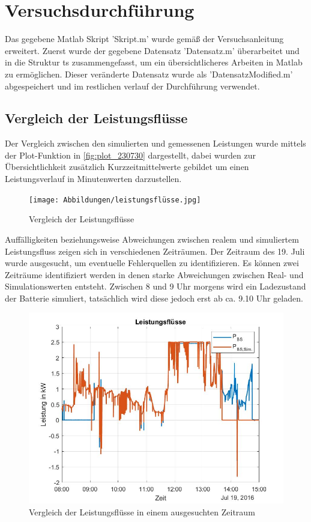 \newpage
\section{Versuchsdurchführung}
Das gegebene Matlab Skript 'Skript.m' wurde gemäß der Versuchsanleitung \cite[S. 11]{Laboranleitung} erweitert.
Zuerst wurde der gegebene Datensatz 'Datensatz.m' überarbeitet und in die Struktur ts zusammengefasst, um ein übersichtlicheres Arbeiten in Matlab zu ermöglichen.
Dieser veränderte Datensatz wurde als 'DatensatzModified.m' abgespeichert und im restlichen verlauf der Durchführung verwendet.

\subsection{Vergleich der Leistungsflüsse}
Der Vergleich zwischen den simulierten und gemessenen Leistungen wurde mittels der Plot-Funktion in \autoref{fig:plot_230730} dargestellt,
dabei wurden zur Übersichtlichkeit zusätzlich Kurzzeitmittelwerte gebildet um einen Leistungsverlauf in Minutenwerten darzustellen.

\begin{figure}[H]
    \centering
    \texttt{[image: Abbildungen/leistungsflüsse.jpg]}
    \caption{Vergleich der Leistungsflüsse}
    \label{fig:plot_230730}
\end{figure}


Auffälligkeiten beziehungsweise Abweichungen zwischen realem und simuliertem Leistungsfluss zeigen sich in verschiedenen Zeiträumen.
Der Zeitraum des 19. Juli wurde ausgesucht, um eventuelle Fehlerquellen zu identifizieren. Es können zwei Zeiträume identifiziert werden in denen starke Abweichungen zwischen Real- und Simulationswerten entsteht. Zwischen 8 und 9 Uhr morgens wird ein Ladezustand der Batterie simuliert, tatsächlich wird diese jedoch erst ab ca. 9.10 Uhr geladen.  


\begin{figure}[H]
    \centering
    \includegraphics[width=\textwidth]{Abbildungen/8.15.jpg}
    \caption{Vergleich der Leistungsflüsse in einem ausgesuchten Zeitraum}
    \label{fig:plot_230731}
\end{figure}


